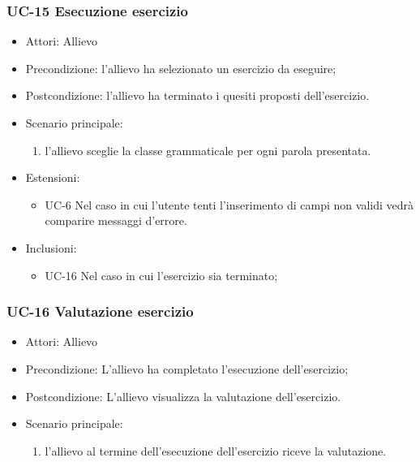 	\subsubsection{UC-15 Esecuzione esercizio}
		\begin{itemize}
			\item Attori: Allievo
			\item Precondizione: l'allievo ha selezionato un esercizio da eseguire;
			\item Postcondizione: l'allievo ha terminato i quesiti proposti dell'esercizio.
			\item Scenario principale:
				\begin{enumerate}
					\item l'allievo sceglie la classe grammaticale per ogni parola presentata.
				\end{enumerate}
			\item Estensioni: 
				\begin{itemize}
					\item UC-6 Nel caso in cui l'utente tenti l'inserimento di campi non validi vedrà comparire messaggi d'errore.
				\end{itemize}
			\item Inclusioni:
				\begin{itemize}
					\item UC-16 Nel caso in cui l'esercizio sia terminato;
				\end{itemize}
			\end{itemize}

	\subsubsection{UC-16 Valutazione esercizio}
	\begin{itemize}
			\item Attori: Allievo
			\item Precondizione: L'allievo ha completato l'esecuzione dell'esercizio;
			\item Postcondizione: L'allievo visualizza la valutazione dell'esercizio.
			\item Scenario principale:
				\begin{enumerate}
					\item l'allievo al termine dell'esecuzione dell'esercizio riceve la valutazione.
				\end{enumerate}
			\end{itemize}
			

